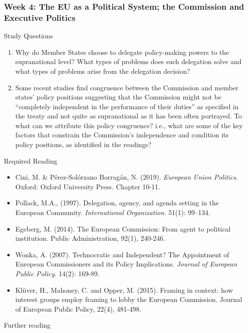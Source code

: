 \subsubsection*{Week 4: The EU as a Political System; the Commission and Executive Politics} 

Study Questions

\begin{enumerate}
	\item Why do Member States choose to delegate policy-making powers to the supranational level? What types of problems does such delegation solve and what types of problems arise from the delegation decision?
	\item Some recent studies find congruence between the Commission and member states’ policy positions suggesting that the Commission might not be “completely independent in the performance of their duties” as specified in the treaty and not quite as supranational as it has been often portrayed. To what can we attribute this policy congruence? i.e., what are some of the key factors that constrain the Commission’s independence and condition its policy positions, as identified in the readings?
	
\end{enumerate}

\noindent Required Reading

\begin{itemize}
	\item Cini, M. \& P\'{e}rez-Sol\'{o}rzano Borrag\'{a}n, N. (2019). \textit{European Union Politics}. Oxford: Oxford University Press. Chapter 10-11.
	\item Pollack, M.A., (1997). Delegation, agency, and agenda setting in the European Community. \textit{International Organization}. 51(1): 99–134.
	\item Egeberg, M. (2014). The European Commission: From agent to political institution. Public Administration, 92(1), 240-246.
	\item Wonka, A. (2007). Technocratic and Independent? The Appointment of European Commissioners and its Policy Implications. \textit{Journal of European Public Policy}. 14(2): 169-89.
	\item Kl{\"u}ver, H., Mahoney, C. and Opper, M. (2015). Framing in context: how interest groups employ framing to lobby the European Commission. Journal of European Public Policy, 22(4), 481-498.
\end{itemize}

\noindent Further reading

